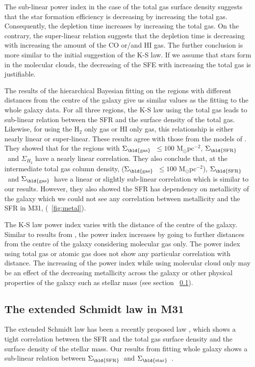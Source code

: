 \documentclass[useAMS,usenatbib]{mn2e}
\newcommand \sigmagas    {$\Sigma_{\rm \bld {gas }} $\ }
\newcommand \sigmasfr     {$\Sigma_{\rm \bld {SFR }} $\ }
\newcommand \sigmastar    {$\Sigma_{\rm \bld {star }} $\ }
\begin{document}
The sub-linear power index in the case of the total gas surface density suggests that the star formation efficiency is decreasing by increasing the total gas. Consequently, the depletion time increases by increasing the total gas. On the contrary, the super-linear relation suggests that the depletion time is decreasing with increasing the amount of the CO or/and HI gas. The further conclusion is more similar to the initial suggestion of the K-S law. If we assume that stars form in the molecular clouds, the decreasing of the SFE with increasing the total gas is justifiable.  

The results of the hierarchical Bayesian fitting on the regions with different distances from the centre of the galaxy give us similar values as the fitting to the whole galaxy data. For all three regions, the K-S law using the total gas leads to sub-linear relation between the SFR and the surface density of the total gas. Likewise, for using the H$_{2}$ only gas or HI only gas, this relationship is either nearly linear or super-linear. These results agree with those from the models of \cite{Krumholz09}. They showed that for the regions with \sigmagas $\leq 100$ M$_{\odot}$pc$^{-2}$, \sigmasfr and $\Sigma_{H_2}$ have a nearly linear correlation. They also conclude that, at the intermediate total gas column density, (\sigmagas $\leq 100$ M$_{\odot}$pc$^{-2}$), \sigmasfr and \sigmagas have a linear or slightly sub-linear correlation which is similar to our results. However, they also showed the SFR has dependency on metallicity of the galaxy which we could not see any correlation between metallicity and the SFR in M31, (~\ref{fig:metal}). 

The K-S law power index varies with the distance of the centre of the galaxy. Similar to results from \cite{Ford13}, the power index increases by going to further distances from the centre of the galaxy considering molecular gas only. The power index using total gas or atomic gas does not show any particular correlation with distance. The increasing of the power index while using molecular cloud only may be an effect of the decreasing metallicity across the galaxy or other physical properties of the galaxy such as stellar mass (see section ~\ref{sec:es_res}).

  
\subsection{The extended Schmidt law in M31}
\label{sec:es_res}
The extended Schmidt law has been a recently proposed law \citep{Shi11}, which shows a tight correlation between the SFR and the total gas surface density and the surface density of the stellar mass. Our results from fitting whole galaxy shows a sub-linear relation between \sigmasfr and \sigmastar.
\end{document}
